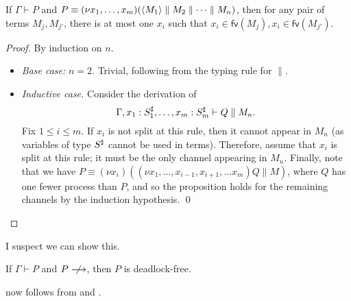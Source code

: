 \documentclass[orivec,envcountsame]{llncs}
\begin{document}
\begin{lemma}\label{thm:procs-share-one-channel}
  If $\Gamma \vdash P$ and $P \equiv (\nu x_1,\dots,x_m)(\langle M_1 \rangle \parallel M_2 \parallel
  \dots \parallel M_n)$, then for any pair of terms $M_j,M_{j'}$, there is at most one $x_i$ such
  that $x_i \in \mathsf{fv}(M_j),x_i \in \mathsf{fv}(M_{j'})$.
\end{lemma}

\begin{proof}
  By induction on $n$.
  \begin{itemize}
  \item \textit{Base case:} $n = 2$.  Trivial, following from the typing rule for $\parallel$.
  \item \textit{Inductive case.} Consider the derivation of
    \[ \Gamma,x_1:S_1^\sharp,\dots,x_m:S_m^\sharp \vdash Q \parallel M_n. \] Fix $1 \leq i
    \leq m$.  If $x_i$ is not split at this rule, then it cannot appear in $M_n$ (as variables of
    type $S^\sharp$ cannot be used in terms).  Therefore, assume that $x_i$ is split at this
    rule; it must be the only channel appearing in $M_n$.  Finally, note that we have $P \equiv (\nu
    x_i)((\nu x_1,\dots,x_{i-1},x_{i+1},\dots x_m)Q \parallel M)$, where $Q$ has one fewer process
    than $P$, and so the proposition holds for the remaining channels by the induction
    hypothesis. \qed
  \end{itemize}
\end{proof}

I suspect we can show this.

\begin{lemma}\label{thm:typed-stuck-df}
  If $\Gamma \vdash P$ and $P \centernot\ceval$, then $P$ is deadlock-free.
\end{lemma}

 now follows from  and .
\end{document}
